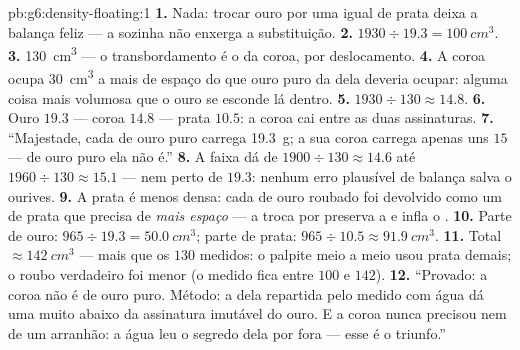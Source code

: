 \begin{solution}{pb:g6:density-floating:1}
\textbf{1.} Nada: trocar ouro por uma \emph{} igual de prata
deixa a balança feliz --- a  sozinha não enxerga a
substituição.
\textbf{2.} $1930 \div 19.3 = \qty{100}{cm^3}$.
\textbf{3.} \qty{130}{cm^3} --- o transbordamento é o  da
coroa, por deslocamento.
\textbf{4.} A coroa ocupa \qty{30}{cm^3} a mais de espaço do que
ouro puro da  dela deveria ocupar: alguma coisa mais volumosa
que o ouro se esconde lá dentro.
\textbf{5.} $1930 \div 130 \approx 14.8$.
\textbf{6.} Ouro $19.3$ --- coroa $14.8$ --- prata $10.5$: a coroa
cai entre as duas assinaturas.
\textbf{7.} ``Majestade, cada  de ouro puro carrega
\qty{19.3}{g}; a sua coroa carrega apenas uns $15$ --- de ouro puro
ela não é.''
\textbf{8.} A faixa dá  de $1900 \div 130 \approx 14.6$ até
$1960 \div 130 \approx 15.1$ --- nem perto de $19.3$: nenhum erro
plausível de balança salva o ourives.
\textbf{9.} A prata é menos densa: cada  de ouro roubado foi
devolvido como um  de prata que precisa de \emph{mais espaço}
--- a troca  por  preserva a  e infla o .
\textbf{10.} Parte de ouro: $965 \div 19.3 = \qty{50.0}{cm^3}$;
parte de prata: $965 \div 10.5 \approx \qty{91.9}{cm^3}$.
\textbf{11.} Total $\approx \qty{142}{cm^3}$ --- mais que os $130$
medidos: o palpite meio a meio usou prata demais; o roubo verdadeiro
foi menor (o  medido fica entre $100$ e $142$).
\textbf{12.} ``Provado: a coroa não é de ouro puro. Método: a 
dela repartida pelo  medido com água dá uma  muito
abaixo da assinatura imutável do ouro. E a coroa nunca precisou nem
de um arranhão: a água leu o segredo dela por fora --- esse é o
triunfo.''
\end{solution}
